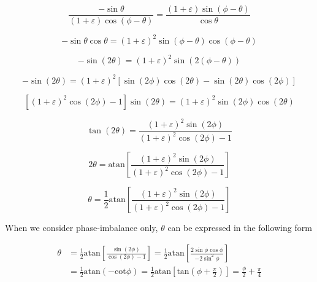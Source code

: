 \documentclass{article}
\begin{document}
\begin{equation}
	\frac{-\sin\theta}{(1+\varepsilon)\cos(\phi-\theta)} = \frac{(1+\varepsilon)\sin(\phi-\theta)}{\cos\theta}
\end{equation}

\begin{equation}
	-\sin\theta\cos\theta = (1+\varepsilon)^2\sin(\phi-\theta)\cos(\phi-\theta)
\end{equation}

\begin{equation}
	-\sin(2\theta) = (1+\varepsilon)^2\sin(2(\phi-\theta))
\end{equation}

\begin{equation}
	-\sin(2\theta)=(1+\varepsilon)^2\left[\sin(2\phi)\cos(2\theta) - \sin(2\theta)\cos(2\phi)\right]
\end{equation}

\begin{equation}
	\left[(1+\varepsilon)^2\cos(2\phi)-1\right]\sin(2\theta)=(1+\varepsilon)^2\sin(2\phi)\cos(2\theta)
\end{equation}

\begin{equation}
	\tan(2\theta)=\frac{(1+\varepsilon)^2\sin(2\phi)}{(1+\varepsilon)^2\cos(2\phi)-1}
\end{equation}

\begin{equation}
	2\theta = \text{atan}\left[\frac{(1+\varepsilon)^2\sin(2\phi)}{(1+\varepsilon)^2\cos(2\phi)-1}\right]
\end{equation}

\begin{equation}
	\theta = \frac{1}{2}\text{atan}\left[\frac{(1+\varepsilon)^2\sin(2\phi)}{(1+\varepsilon)^2\cos(2\phi)-1}\right]
\end{equation}

When we consider phase-imbalance only, $\theta$ can be expressed in the following form

\begin{equation}
\begin{split}
	\theta &= \frac{1}{2}\text{atan}\left[\frac{\sin(2\phi)}{\cos(2\phi)-1}\right] = \frac{1}{2}\text{atan}\left[\frac{2\sin\phi\cos\phi}{-2\sin^2\phi}\right] \\
	&= \frac{1}{2}\text{atan}(-\text{cot}\phi) = \frac{1}{2}\text{atan}\left[\text{tan}\left(\phi+\frac{\pi}{2}\right)\right] = \frac{\phi}{2}+\frac{\pi}{4}
\end{split}
\end{equation}
\end{document}
